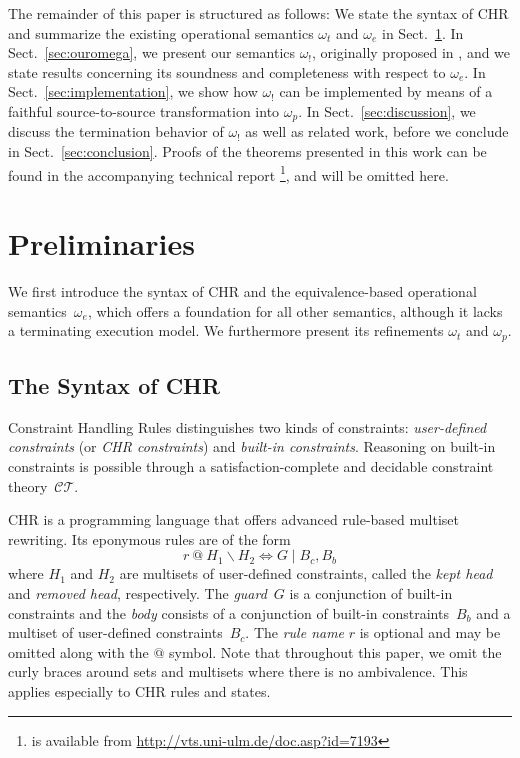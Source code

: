\documentclass{tlp}
\newcommand{\CT}{\ensuremath{\mathcal{CT}}}
\newcommand{\bang}{\ensuremath{!}}
\newcommand{\obang}{\ensuremath{{\omega_\bang}}}
\newcommand{\oesq}{\ensuremath{{\omega_e}}}
\begin{document}
The remainder of this paper is structured as follows: We state the syntax of CHR
and summarize the existing operational semantics $\omega_t$ and $\omega_e$ in
Sect.~\ref{sec:opsems}. In Sect.~\ref{sec:ouromega}, we present our semantics
$\obang$, originally proposed in \cite{Betz2009}, and we state results concerning
its soundness and completeness with respect to $\oesq$. In
Sect.~\ref{sec:implementation}, we show how $\obang$ can be implemented by means
of a faithful source-to-source transformation into $\omega_p$. In
Sect.~\ref{sec:discussion}, we discuss the termination behavior of $\obang$ as
well as related work, before we conclude in Sect.~\ref{sec:conclusion}.
Proofs of the theorems presented in this work can be found in the accompanying
technical report \cite{Betz2010} \footnote{\cite{Betz2010} is available from
\url{http://vts.uni-ulm.de/doc.asp?id=7193}}, and will be omitted here.

\section{Preliminaries}
\label{sec:opsems}

We first introduce the syntax of CHR and the equivalence-based operational
semantics~$\oesq$, which offers a foundation for all other semantics, although it
lacks a terminating execution model. We furthermore present its refinements
$\omega_t$ and $\omega_p$.

\subsection{The Syntax of CHR}

Constraint Handling Rules distinguishes two kinds of constraints:
\emph{user-defined constraints} (or \emph{CHR constraints}) and \emph{built-in
constraints}. Reasoning on built-in constraints is possible through a
satisfaction-complete and decidable constraint theory~\CT.

CHR is a programming language that offers advanced rule-based multiset rewriting.
Its eponymous rules are of the form \[ r\ @\ H_1 \backslash H_2 \Leftrightarrow G
\mid B_c, B_b \] where $H_1$ and $H_2$ are multisets of user-defined constraints,
called the \emph{kept head} and \emph{removed head}, respectively. The
\emph{guard}~$G$ is a conjunction of built-in constraints and the
 \emph{body} consists of a conjunction of built-in constraints~$B_b$ and a
 multiset of
user-defined constraints~$B_c$. The \emph{rule name} $r$ is optional and may be
omitted along with the $@$ symbol. Note that throughout this paper, we omit the
curly braces around sets and multisets where there is no ambivalence. This
applies especially to CHR rules and states.
\end{document}
